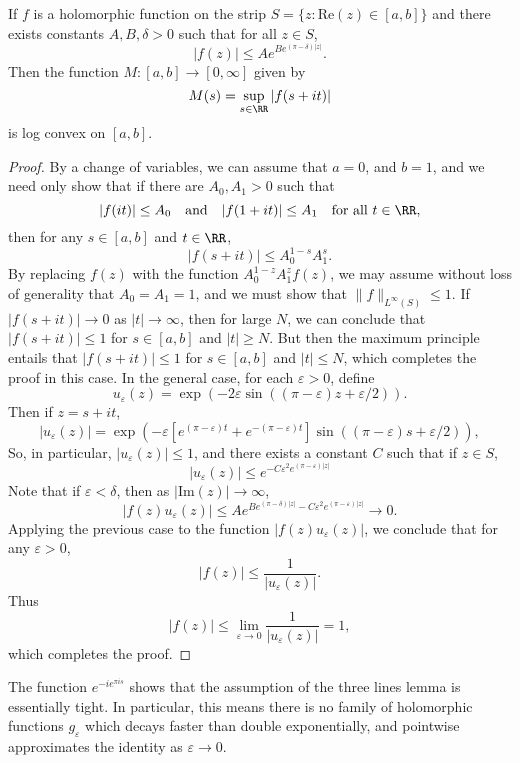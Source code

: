 \begin{theorem}
    If $f$ is a holomorphic function on the strip $S = \{ z : \text{Re}(z) \in [a,b] \}$ and there exists constants $A,B,\delta > 0$ such that for all $z \in S$,
    \[ |f(z)| \leq Ae^{Be^{(\pi - \delta)|z|}}. \]
    Then the function $M: [a,b] \to [0,\infty]$ given by
    \[ M(s) = \sup_{s \in \RR} |f(s + it)| \]
    is log convex on $[a,b]$.
\end{theorem}
\begin{proof}
    By a change of variables, we can assume that $a = 0$, and $b = 1$, and we need only show that if there are $A_0, A_1 > 0$ such that
    \[ |f(it)| \leq A_0 \quad\text{and}\quad |f(1 + it)| \leq A_1 \quad \text{for all $t \in \RR$}, \]
    then for any $s \in [a,b]$ and $t \in \RR$,
    \[ |f(s + it)| \leq A_0^{1 - s} A_1^s. \]
    By replacing $f(z)$ with the function $A_0^{1-z} A_1^z f(z)$, we may assume without loss of generality that $A_0 = A_1 = 1$, and we must show that $\| f \|_{L^\infty(S)} \leq 1$. If $|f(s + it)| \to 0$ as $|t| \to \infty$, then for large $N$, we can conclude that $|f(s + it)| \leq 1$ for $s \in [a,b]$ and $|t| \geq N$. But then the maximum principle entails that $|f(s + it)| \leq 1$ for $s \in [a,b]$ and $|t| \leq N$, which completes the proof in this case. In the general case, for each $\varepsilon > 0$, define
    \[ u_\varepsilon(z) = \exp(- 2 \varepsilon \sin((\pi - \varepsilon) z + \varepsilon/2)). \]
    Then if $z = s + it$,
    \[ |u_\varepsilon(z)| = \exp(- \varepsilon [e^{(\pi - \varepsilon) t} + e^{-(\pi - \varepsilon) t}] \sin((\pi - \varepsilon) s + \varepsilon/2)), \]
    So, in particular, $|u_\varepsilon(z)| \leq 1$, and there exists a constant $C$ such that if $z \in S$,
    \[ |u_\varepsilon(z)| \leq e^{- C \varepsilon^2 e^{(\pi - \varepsilon) |z|}} \]
    Note that if $\varepsilon < \delta$, then as $|\text{Im}(z)| \to \infty$,
    \[ |f(z) u_\varepsilon(z)| \leq A e^{B e^{(\pi - \delta) |z|} - C \varepsilon^2 e^{(\pi - \varepsilon) |z|} } \to 0. \]
    Applying the previous case to the function $|f(z) u_\varepsilon(z)|$, we conclude that for any $\varepsilon > 0$,
    \[ |f(z)| \leq \frac{1}{|u_\varepsilon(z)|}. \]
    Thus
    \[ |f(z)| \leq \lim_{\varepsilon \to 0} \frac{1}{|u_\varepsilon(z)|} = 1, \]
    which completes the proof.
\end{proof}

\begin{remark}
    The function $e^{-ie^{\pi i s}}$ shows that the assumption of the three lines lemma is essentially tight. In particular, this means there is no family of holomorphic functions $g_\varepsilon$ which decays faster than double exponentially, and pointwise approximates the identity as $\varepsilon \to 0$.
\end{remark}

